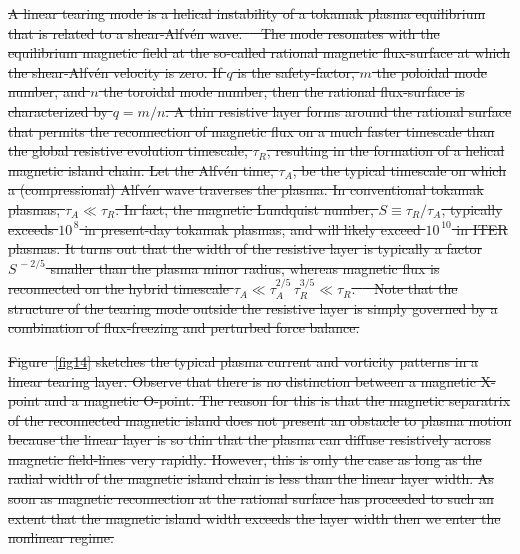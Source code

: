 \documentclass[12pt,prb,aps]{revtex4-1}
\providecommand{\DIFdel}[1]{{\protect\color{red}\sout{#1}}}                      %
\begin{document}
\DIFdel{A linear tearing mode is a helical instability of a tokamak plasma equilibrium that is related to a shear-Alfv\'{e}n wave.\mbox{%
\cite{haz} }\hspace{0pt}%
The mode resonates with the equilibrium magnetic field at
the so-called rational magnetic flux-surface at which the
shear-Alfv\'{e}n velocity is zero. If $q$ is the safety-factor, $m$ the poloidal mode number, and $n$ the
toroidal mode number, then the rational
flux-surface is characterized by $q=m/n$. A thin resistive layer forms
around the rational surface that permits the reconnection of magnetic flux on a much faster timescale than the global
resistive evolution timescale, $\tau_R$, resulting in the formation of a helical magnetic island chain. Let the Alfv\'{e}n time,
$\tau_A$, be the
typical timescale on which a (compressional) Alfv\'{e}n
wave traverses the plasma.
In conventional tokamak plasmas, $\tau_A\ll \tau_R$. In fact,
the magnetic Lundquist number, $S\equiv \tau_R/\tau_A$,  typically exceeds $10^{\,8}$ in present-day tokamak plasmas,
and will likely exceed $10^{\,10}$ in ITER plasmas.
 It turns out that the width of the resistive layer is typically a factor $S^{\,-2/5}$ smaller than the
plasma minor radius, whereas magnetic flux is reconnected on
the hybrid timescale $\tau_A\ll \tau_A^{2/5}\,\tau_R^{3/5}\ll \tau_R$.\mbox{%
\cite{fkr} }\hspace{0pt}%
Note that  the
structure of the tearing mode  outside the resistive layer is simply governed by a combination of flux-freezing and perturbed force balance. 
}%

\DIFdel{Figure~\ref{fig14} sketches the typical plasma current and vorticity patterns in a linear tearing layer. Observe that there is
 no distinction between a magnetic X-point and a magnetic 
O-point. The reason for this is that the magnetic separatrix
of the reconnected magnetic island does not present an obstacle
to plasma motion because the linear layer is so thin that the
plasma can diffuse resistively across magnetic field-lines very rapidly. However, this is only the case as long
as the radial width of the magnetic island chain is less than the linear layer width. As soon as magnetic reconnection
at the rational surface has proceeded to such an extent that
the magnetic island width exceeds the layer width then we enter the nonlinear regime. 
}%
\end{document}
